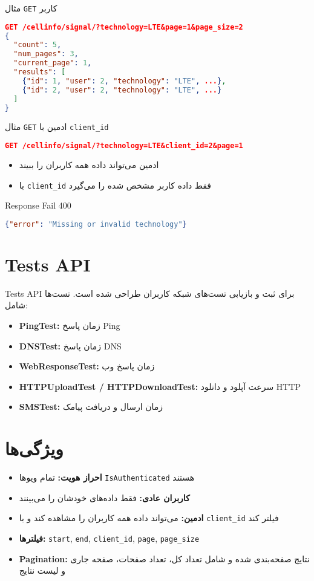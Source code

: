\documentclass{report}
\begin{document}
مثال \texttt{GET} کاربر
\begin{lstlisting}[language=json]
GET /cellinfo/signal/?technology=LTE&page=1&page_size=2
{
  "count": 5,
  "num_pages": 3,
  "current_page": 1,
  "results": [
    {"id": 1, "user": 2, "technology": "LTE", ...},
    {"id": 2, "user": 2, "technology": "LTE", ...}
  ]
}
\end{lstlisting}

مثال \texttt{GET} ادمین با \texttt{client\_id}
\begin{lstlisting}[language=json]
GET /cellinfo/signal/?technology=LTE&client_id=2&page=1
\end{lstlisting}
\begin{itemize}
    \item ادمین می‌تواند داده همه کاربران را ببیند
    \item با \texttt{client\_id} فقط داده کاربر مشخص شده را می‌گیرد
\end{itemize}

Response Fail 400
\begin{lstlisting}[language=json]
{"error": "Missing or invalid technology"}
\end{lstlisting}

\section{Tests API}
Tests API برای ثبت و بازیابی تست‌های شبکه کاربران طراحی شده است. تست‌ها شامل:
\begin{itemize}
    \item \textbf{PingTest:} زمان پاسخ Ping
    \item \textbf{DNSTest:} زمان پاسخ DNS
    \item \textbf{WebResponseTest:} زمان پاسخ وب
    \item \textbf{HTTPUploadTest / HTTPDownloadTest:} سرعت آپلود و دانلود HTTP
    \item \textbf{SMSTest:} زمان ارسال و دریافت پیامک
\end{itemize}

\section{ویژگی‌ها}
\begin{itemize}
    \item \textbf{احراز هویت:} تمام ویوها \texttt{IsAuthenticated} هستند
    \item \textbf{کاربران عادی:} فقط داده‌های خودشان را می‌بینند
    \item \textbf{ادمین:} می‌تواند داده همه کاربران را مشاهده کند و با \texttt{client\_id} فیلتر کند
    \item \textbf{فیلترها:} \texttt{start}, \texttt{end}, \texttt{client\_id}, \texttt{page}, \texttt{page\_size}
    \item \textbf{Pagination:} نتایج صفحه‌بندی شده و شامل تعداد کل، تعداد صفحات، صفحه جاری و لیست نتایج
\end{itemize}
\end{document}
